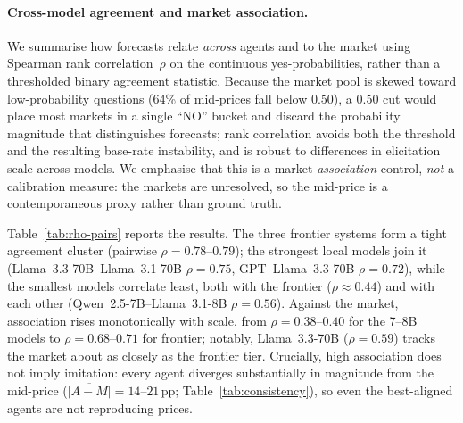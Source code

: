 \documentclass{article} %
\begin{document}
\paragraph{Cross-model agreement and market association.}
We summarise how forecasts relate \emph{across} agents and to the market using Spearman
rank correlation~$\rho$ on the continuous yes-probabilities, rather than a thresholded
binary agreement statistic.  Because the market pool is skewed toward low-probability
questions (64\% of mid-prices fall below 0.50), a 0.50 cut would place most markets in a
single ``NO'' bucket and discard the probability magnitude that distinguishes forecasts;
rank correlation avoids both the threshold and the resulting base-rate instability, and
is robust to differences in elicitation scale across models.  We emphasise that this is a
market-\emph{association} control, \emph{not} a calibration measure: the markets are
unresolved, so the mid-price is a contemporaneous proxy rather than ground truth.

Table~\ref{tab:rho-pairs} reports the results.  The three frontier systems form a
tight agreement cluster (pairwise $\rho = 0.78$--$0.79$); the strongest local models
join it (Llama~3.3-70B--Llama~3.1-70B $\rho=0.75$, GPT--Llama~3.3-70B $\rho=0.72$),
while the smallest models correlate least, both with the frontier ($\rho \approx 0.44$)
and with each other (Qwen~2.5-7B--Llama~3.1-8B $\rho=0.56$).  Against the market,
association rises monotonically with scale, from $\rho=0.38$--$0.40$ for the 7--8B models
to $\rho=0.68$--$0.71$ for frontier; notably, Llama~3.3-70B ($\rho=0.59$) tracks the
market about as closely as the frontier tier.  Crucially, high association does not
imply imitation: every agent diverges substantially in magnitude from the mid-price
($\overline{|A{-}M|}=14$--$21$\,pp; Table~\ref{tab:consistency}), so even the
best-aligned agents are not reproducing prices.
\end{document}
